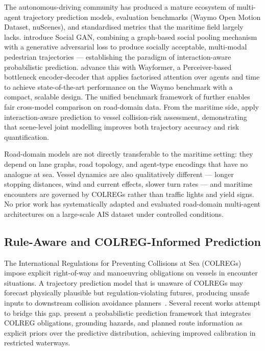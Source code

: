 \documentclass[12pt, a4paper]{article}
\begin{document}
  The autonomous-driving community has produced a mature ecosystem of
  multi-agent trajectory prediction models, evaluation benchmarks (Waymo Open
  Motion Dataset, nuScenes), and standardised metrics that the maritime field
  largely lacks.  \citet{gupta2018socialgan} introduce Social GAN, combining a
  graph-based social pooling mechanism with a generative adversarial loss to
  produce socially acceptable, multi-modal pedestrian trajectories — establishing
  the paradigm of interaction-aware probabilistic prediction.
  \citet{nayakanti2022wayformer} advance this with Wayformer, a Perceiver-based
  bottleneck encoder-decoder that applies factorised attention over agents and
  time to achieve state-of-the-art performance on the Waymo benchmark with a
  compact, scalable design.  The unified benchmark framework of
  \citet{feng2024unitraj} further enables fair cross-model comparison on
  road-domain data.  From the maritime side, \citet{alam2025multivessel} apply
  interaction-aware prediction to vessel collision-risk assessment, demonstrating
  that scene-level joint modelling improves both trajectory accuracy and risk
  quantification.

  Road-domain models are not directly transferable to the maritime setting:
  they depend on lane graphs, road topology, and agent-type encodings that have
  no analogue at sea.  Vessel dynamics are also qualitatively different —
  longer stopping distances, wind and current effects, slower turn rates —
  and maritime encounters are governed by COLREGs rather than traffic lights and
  yield signs.  No prior work has systematically adapted and evaluated
  road-domain multi-agent architectures on a large-scale AIS dataset under
  controlled conditions.

  \subsection{Rule-Aware and COLREG-Informed Prediction}

  The International Regulations for Preventing Collisions at Sea
  (COLREGs)~\citep{colregs1972} impose explicit right-of-way and manoeuvring
  obligations on vessels in encounter situations.  A trajectory prediction model
  that is unaware of COLREGs may forecast physically plausible but
  regulation-violating futures, producing unsafe inputs to downstream collision
  avoidance planners~\citep{kuwata2014safe, vagale2021path}.  Several recent works
  attempt to bridge this gap.  \citet{mahipala2025colreg} present a probabilistic
  prediction framework that integrates COLREG obligations, grounding hazards, and
  planned route information as explicit priors over the predictive distribution,
  achieving improved calibration in restricted waterways.
\end{document}
